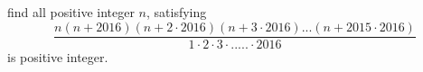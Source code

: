 find all positive integer $n$, satisfying
$$\frac{n(n+2016)(n+2\cdot 2016)(n+3\cdot 2016) . . . (n+2015\cdot 2016)}{1\cdot 2 \cdot 3 \cdot . . . . . \cdot 2016}$$is positive integer.